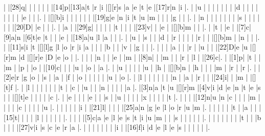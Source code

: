 \documentclass[12pt]{article}
\begin{document}
\begin{Puzzle}{22}{24}
  |{}  |[28]q|{}  |{}  |{}  |{}  |{}  |{}  |[14]p|[13]a|t   |r   |i   |[][r]s   |a   |e   |t   |e   |[17]r|n   |i   |.
  |{}  |u   |{}  |{}  |{}  |{}  |{}  |{}  |{}  |d   |{}  |{}  |{}  |{}  |{}  |{}  |{}  |{}  |e   |{}  |{}  |.
  |{}  |[][b]i   |{}  |{}  |{}  |{}  |{}  |{}  |[19]g|e   |n   |i   |t   |u   |m   |{}  |{}  |{}  |g   |{}  |{}  |.
  |{}  |n   |{}  |{}  |{}  |{}  |{}  |{}  |{}  |s   |{}  |{}  |{}  |{}  |{}  |{}  |[20]D|{}  |e   |{}  |{}  |.
  |{}  |a   |{}  |[29]g|{}  |{}  |{}  |{}  |{}  |t   |{}  |{}  |{}  |[23]v|{}  |{}  |e   |{}  |[][b]m   |{}  |{}  |.
  |{}  |t   |{}  |e   |{}  |[7]c|[9]a|n   |[6]t|e   |t   |{}  |{}  |e   |{}  |[18]a|u   |l   |a   |{}  |{}  |.
  |{}  |u   |{}  |s   |{}  |{}  |d   |{}  |r   |{}  |{}  |{}  |{}  |r   |{}  |{}  |[][b]m   |{}  |n   |{}  |{}  |.
  |{}  |[11]s|i   |t   |[][l]g   |l   |o   |r   |i   |a   |{}  |{}  |{}  |b   |{}  |{}  |v   |{}  |g   |{}  |{}  |.
  |{}  |{}  |{}  |a   |{}  |{}  |r   |{}  |u   |{}  |{}  |[22]D|e   |u   |[][r]m   |d   |[][r]e   |D   |e   |o   |{}  |.
  |{}  |{}  |{}  |n   |{}  |{}  |e   |{}  |m   |{}  |[8]n|{}  |{}  |m   |{}  |{}  |r   |{}  |l   |{}  |[26]c|.
  |{}  |[1]p|{}  |t   |{}  |{}  |m   |{}  |p   |{}  |o   |{}  |[10]c|{}  |{}  |{}  |u   |{}  |o   |{}  |a   |.
  |{}  |u   |{}  |{}  |{}  |{}  |u   |{}  |h   |{}  |[][b]n   |{}  |h   |{}  |{}  |{}  |m   |{}  |r   |{}  |r   |.
  |{}  |[2]e|r   |g   |o   |{}  |s   |{}  |a   |{}  |f   |{}  |o   |{}  |{}  |{}  |{}  |{}  |u   |{}  |o   |.
  |{}  |l   |{}  |{}  |{}  |{}  |{}  |{}  |n   |{}  |a   |{}  |r   |{}  |{}  |[24]i|{}  |{}  |m   |{}  |[][t]f   |.
  |{}  |l   |{}  |{}  |{}  |{}  |{}  |{}  |t   |{}  |c   |{}  |u   |{}  |{}  |n   |{}  |{}  |{}  |{}  |a   |.
  |[3]n|a   |t   |u   |[][r]m   |[4]v|i   |d   |e   |n   |t   |e   |s   |{}  |{}  |[][t]e   |{}  |{}  |{}  |{}  |c   |.
  |{}  |e   |{}  |{}  |{}  |e   |{}  |{}  |s   |{}  |u   |{}  |{}  |{}  |{}  |x   |{}  |{}  |{}  |{}  |t   |.
  |{}  |{}  |{}  |[12]n|u   |n   |c   |{}  |{}  |{}  |m   |{}  |{}  |{}  |{}  |c   |{}  |{}  |{}  |{}  |u   |.
  |{}  |{}  |{}  |{}  |{}  |i   |{}  |[21]l|{}  |{}  |{}  |{}  |[25]a|n   |g   |e   |l   |o   |r   |u   |m   |.
  |{}  |{}  |{}  |{}  |{}  |t   |{}  |a   |{}  |{}  |[15]t|{}  |{}  |{}  |{}  |l   |{}  |{}  |{}  |{}  |{}  |.
  |{}  |{}  |{}  |[5]c|a   |e   |l   |e   |s   |t   |i   |u   |m   |{}  |{}  |s   |{}  |{}  |{}  |{}  |{}  |.
  |{}  |{}  |{}  |{}  |{}  |{}  |{}  |t   |{}  |{}  |b   |{}  |{}  |{}  |[27]v|i   |s   |c   |e   |r   |a   |.
  |{}  |{}  |{}  |{}  |{}  |{}  |{}  |i   |{}  |[16]f|i   |d   |e   |l   |e   |s   |{}  |{}  |{}  |{}  |{}  |.
\end{Puzzle}
\end{document}
